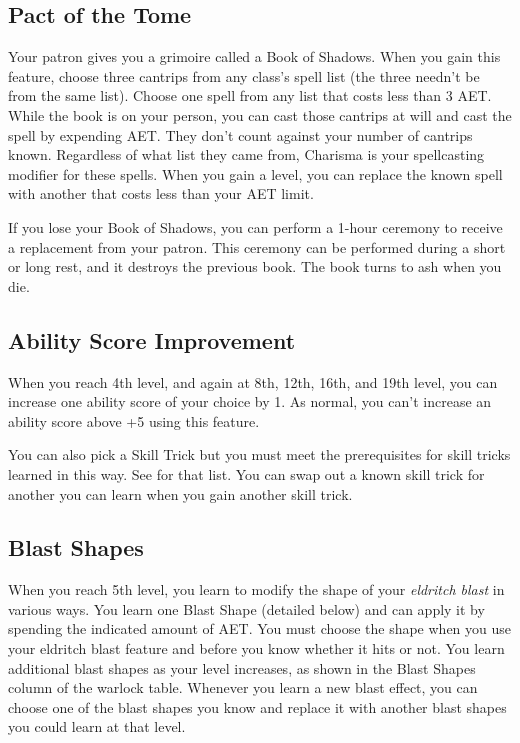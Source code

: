 \subsection{Pact of the Tome}

Your patron gives you a grimoire called a Book of Shadows. When you gain this feature, choose three cantrips from any class's spell list (the three needn't be from the same list). Choose one spell from any list that costs less than 3 AET. While the book is on your person, you can cast those cantrips at will and cast the spell by expending AET. They don't count against your number of cantrips known. Regardless of what list they came from, Charisma is your spellcasting modifier for these spells. When you gain a level, you can replace the known spell with another that costs less than your AET limit.

If you lose your Book of Shadows, you can perform a 1-hour ceremony to receive a replacement from your patron. This ceremony can be performed during a short or long rest, and it destroys the previous book. The book turns to ash when you die.

\subsection{Ability Score Improvement}

When you reach 4th level, and again at 8th, 12th, 16th, and 19th level, you can increase one ability score of your choice by 1.  As normal, you can't increase an ability score above +5 using this feature.

You can also pick a Skill Trick but you must meet the prerequisites for skill tricks learned in this way. See  for that list. You can swap out a known skill trick for another you can learn when you gain another skill trick.

\subsection{Blast Shapes}

When you reach 5th level, you learn to modify the shape of your \textit{eldritch blast} in various ways. You learn one Blast Shape (detailed below) and can apply it by spending the indicated amount of AET. You must choose the shape when you use your eldritch blast feature and before you know whether it hits or not. You learn additional blast shapes as your level increases, as shown in the Blast Shapes column of the warlock table. Whenever you learn a new blast effect, you can choose one of the blast shapes you know and replace it with another blast shapes you could learn at that level.

